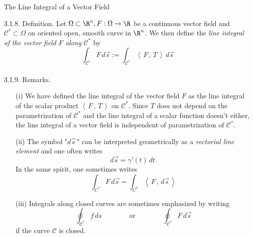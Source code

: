 \documentclass[smaller,hyperref={CJKbookmarks=true}]{beamer}
\newcommand{\scp}[2]{\left\langle\,#1\,,\,#2\,\right\rangle} \newcommand{\scpp}{\langle\,\cdot\,,\,\cdot\,\rangle}
\begin{document}
\begin{frame}{The Line Integral of a Vector Field}
\begin{spacing}{1.05}
\alert{3.1.8. Definition.} Let $\Omega\subset\R^n,F:\Omega\to\R$ be a continuous vector field and $\mathcal{C}^*\subset\Omega$ on oriented open, smooth curve in $\R^n$. We then define the \emph{line integral of the vector field $F$ along $\mathcal{C}^*$} by
\begin{equation}\label{3.1.5}
  \int_{\mathcal{C}^*}F\,d\vec{s}:=
  \int_{\mathcal{C}^*}\scp{F}{T}\,d\vec{s}
\end{equation}
 \\[9pt]
\alert{3.1.9. Remarks.}
\begin{itemize}
  \item[(i)] We have defined the line integral of the vector field $F$ as the line
      integral of the scalar product $\scp{F}{T}$ on $\mathcal{C}^*$. Since $T$ does not depend on the parametrization of $\mathcal{C}^*$ and the line integral of a scalar function doesn't either, the line integral of a vector field is independent of
parametrization of $\mathcal{C}^*$.
\end{itemize}
\newpage
\vspace*{5pt}
\begin{itemize}
  \item[(ii)] The symbol "$d\vec{s}$\," can be interpreted geometrically as a \emph{vectorial line
      element} and one often writes
      \[d\vec{s}=\gamma'(t)\,dt.\]
      In the same spirit, one sometimes writes
      \[\int_{C^*}F\,d\vec{s}=\int_{C^*}\scp{F}{d\vec{s}}\]
  \item[(iii)] Integrals along closed curves are sometimes emphasized by writing
      \[\oint_{\mathcal{C}^*}f\,ds\qquad\qquad
      \text{or}\qquad\qquad\oint_{\mathcal{C}^*}F\,d\vec{s}\]
      if the curve $\mathcal{C}$ is closed.
\end{itemize}
\end{spacing}
\end{frame}
\end{document}
